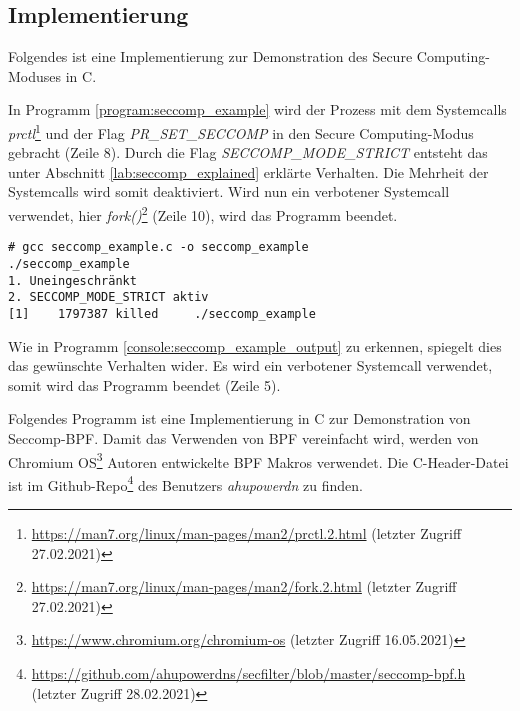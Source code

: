 \begin{samepage}
\subsection{Implementierung}
Folgendes ist eine Implementierung zur Demonstration des Secure Computing-Moduses in C. 



\end{samepage}

In Programm \ref{program:seccomp_example} wird der Prozess mit dem Systemcalls
\emph{prctl}\footnote{\url{https://man7.org/linux/man-pages/man2/prctl.2.html}
(letzter Zugriff 27.02.2021)} und der Flag \linebreak
\mbox{\emph{PR\_SET\_SECCOMP}}  in den Secure Computing-Modus gebracht (Zeile
8). Durch die Flag \emph{SECCOMP\_MODE\_STRICT} entsteht das unter Abschnitt
\ref{lab:seccomp_explained} erklärte Verhalten. Die Mehrheit der Systemcalls
wird somit deaktiviert. Wird nun ein verbotener Systemcall verwendet, hier
\emph{fork()}\footnote{\url{https://man7.org/linux/man-pages/man2/fork.2.html}
(letzter Zugriff 27.02.2021)} (Zeile 10), wird das Programm beendet.

\begin{lstlisting}[label={console:seccomp_example_output},caption={Kompilieren
und Ausführen des Programms \ref{program:seccomp_example}}]
# gcc seccomp_example.c -o seccomp_example
./seccomp_example
1. Uneingeschränkt
2. SECCOMP_MODE_STRICT aktiv
[1]    1797387 killed     ./seccomp_example
\end{lstlisting}
Wie in Programm \ref{console:seccomp_example_output} zu erkennen, spiegelt dies
das gewünschte Verhalten wider. Es wird ein verbotener Systemcall verwendet,
somit wird das Programm beendet (Zeile 5).

Folgendes Programm ist eine Implementierung in C zur Demonstration von
Seccomp-BPF. Damit das Verwenden von BPF vereinfacht wird, werden von Chromium
OS\footnote{\url{https://www.chromium.org/chromium-os} (letzter Zugriff
16.05.2021)} Autoren entwickelte BPF Makros verwendet. Die C-Header-Datei ist
im
Github-Repo\footnote{\url{https://github.com/ahupowerdns/secfilter/blob/master/seccomp-bpf.h}
(letzter Zugriff 28.02.2021)} des Benutzers \emph{ahupowerdn} zu finden.
\clearpage




